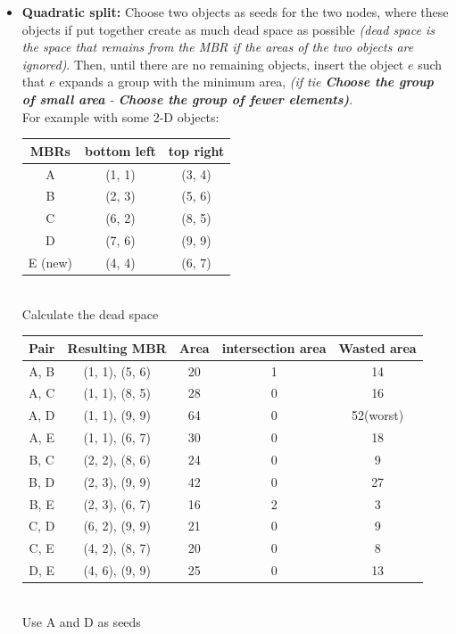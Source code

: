 \documentclass{article}
\begin{document}
\begin{itemize}
\begin{table} [h]
    \end{table}
    \item \textbf{Quadratic split:} Choose two objects as seeds for the two nodes, where these objects if put together create as much dead space as possible \textit{(dead space is the space that remains from the MBR if the areas of the two objects are ignored)}. 
    Then, until there are no remaining objects, insert the object $e$ such that $e$ expands a group with the minimum area, \textit {(if tie \textbf{Choose the group of small area} - \textbf {Choose the group of fewer elements)}}.\\
    For example with some 2-D objects:
    \begin{table}[h]
        \centering
        \begin{tabular}{|c|c|c|}
            \hline
            MBRs & bottom left & top right \\
            \hline
            A & (1, 1) & (3, 4) \\
            B & (2, 3) & (5, 6) \\
            C & (6, 2) & (8, 5) \\
            D & (7, 6) & (9, 9) \\
            E (new) & (4, 4) & (6, 7) \\
            \hline
        \end{tabular}
    \end{table}
    \\
    \clearpage
    Calculate the dead space
    \begin{table} [h]
        \centering
        \begin{tabular}{|c|c|c|c|c|}
            \hline 
            Pair & Resulting MBR & Area & intersection area & Wasted area \\
            \hline
            A, B & (1, 1), (5, 6) & 20 & 1 & 14\\
            \hline
            A, C & (1, 1), (8, 5) & 28 & 0 & 16\\
            \hline
            A, D & (1, 1), (9, 9) & 64 & 0 & 52(worst)\\
            \hline
            A, E & (1, 1), (6, 7) & 30 & 0 & 18\\
            \hline
            B, C & (2, 2), (8, 6) & 24 & 0 & 9\\
            \hline
            B, D & (2, 3), (9, 9) & 42 & 0 & 27\\
            \hline
            B, E & (2, 3), (6, 7) & 16 & 2 & 3\\
            \hline
            C, D & (6, 2), (9, 9) & 21 & 0 & 9\\
            \hline
            C, E & (4, 2), (8, 7) & 20 & 0 & 8\\
            \hline
            D, E & (4, 6), (9, 9) & 25 & 0 & 13\\
            \hline
        \end{tabular}
    \end{table}
    \\
    Use A and D as seeds
    


\end{itemize}
\end{document}
